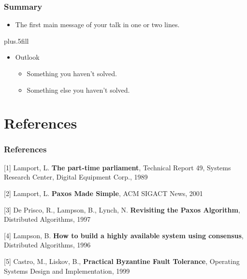 \documentclass[10 pt]{beamer}
\begin{document}
\begin{frame}
\frametitle<presentation>{Summary}

\begin{itemize}
  \item The \alert{first main message} of your talk in one or two lines.
\end{itemize}

\vskip0pt plus.5fill
\begin{itemize}
  \item Outlook
  \begin{itemize}
    \item Something you haven't solved.
    \item Something else you haven't solved.
  \end{itemize}
\end{itemize}

\end{frame}



\section*{References}


\begin{frame}
  \frametitle{References}

[1] Lamport, L. \textbf{The part-time parliament}, Technical Report 49, Systems Research Center, Digital Equipment Corp., 1989
\vspace{4 mm}

[2] Lamport, L. \textbf{Paxos Made Simple}, ACM SIGACT News, 2001
\vspace{4 mm}

[3] De Prisco, R., Lampson, B., Lynch, N. \textbf{Revisiting the Paxos Algorithm}, Distributed Algorithms, 1997
\vspace{4 mm}

[4] Lampson, B. \textbf{How to build a highly available system using consensus}, Distributed Algorithms, 1996
\vspace{4 mm}

[5] Castro, M., Liskov, B., \textbf{Practical Byzantine Fault Tolerance}, Operating Systems Design and Implementation, 1999
  
\end{frame}
\end{document}
